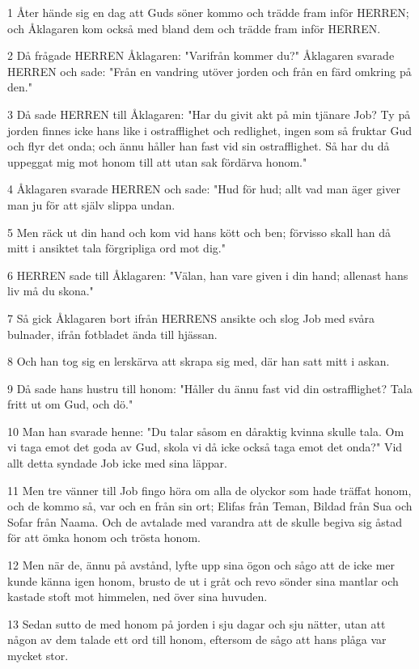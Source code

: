 \par 1 Åter hände sig en dag att Guds söner kommo och trädde fram inför HERREN; och Åklagaren kom också med bland dem och trädde fram inför HERREN.
\par 2 Då frågade HERREN Åklagaren: "Varifrån kommer du?" Åklagaren svarade HERREN och sade: "Från en vandring utöver jorden och från en färd omkring på den."
\par 3 Då sade HERREN till Åklagaren: "Har du givit akt på min tjänare Job? Ty på jorden finnes icke hans like i ostrafflighet och redlighet, ingen som så fruktar Gud och flyr det onda; och ännu håller han fast vid sin ostrafflighet. Så har du då uppeggat mig mot honom till att utan sak fördärva honom."
\par 4 Åklagaren svarade HERREN och sade: "Hud för hud; allt vad man äger giver man ju för att själv slippa undan.
\par 5 Men räck ut din hand och kom vid hans kött och ben; förvisso skall han då mitt i ansiktet tala förgripliga ord mot dig."
\par 6 HERREN sade till Åklagaren: "Välan, han vare given i din hand; allenast hans liv må du skona."
\par 7 Så gick Åklagaren bort ifrån HERRENS ansikte och slog Job med svåra bulnader, ifrån fotbladet ända till hjässan.
\par 8 Och han tog sig en lerskärva att skrapa sig med, där han satt mitt i askan.
\par 9 Då sade hans hustru till honom: "Håller du ännu fast vid din ostrafflighet? Tala fritt ut om Gud, och dö."
\par 10 Man han svarade henne: "Du talar såsom en dåraktig kvinna skulle tala. Om vi taga emot det goda av Gud, skola vi då icke också taga emot det onda?" Vid allt detta syndade Job icke med sina läppar.
\par 11 Men tre vänner till Job fingo höra om alla de olyckor som hade träffat honom, och de kommo så, var och en från sin ort; Elifas från Teman, Bildad från Sua och Sofar från Naama. Och de avtalade med varandra att de skulle begiva sig åstad för att ömka honom och trösta honom.
\par 12 Men när de, ännu på avstånd, lyfte upp sina ögon och sågo att de icke mer kunde känna igen honom, brusto de ut i gråt och revo sönder sina mantlar och kastade stoft mot himmelen, ned över sina huvuden.
\par 13 Sedan sutto de med honom på jorden i sju dagar och sju nätter, utan att någon av dem talade ett ord till honom, eftersom de sågo att hans plåga var mycket stor.


